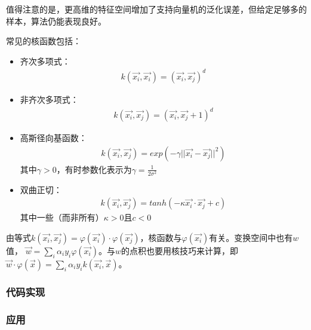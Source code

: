 值得注意的是，更高维的特征空间增加了支持向量机的泛化误差，但给定足够多的样本，算法仍能表现良好。

常见的核函数包括：
\begin{itemize}
    \item 齐次多项式：
        \begin{align}
            k(\overrightarrow{x_i},\overrightarrow{x_i}) = (\overrightarrow{x_i},\overrightarrow{x_j})^d
        \end{align}
    \item 非齐次多项式：
         \begin{align}
            k(\overrightarrow{x_i},\overrightarrow{x_j}) = (\overrightarrow{x_i},\overrightarrow{x_j} + 1)^d
        \end{align}
    \item 高斯径向基函数：
        \begin{align}
            k(\overrightarrow{x_i},\overrightarrow{x_j}) = exp(-\gamma ||\overrightarrow{x_i} - \overrightarrow{x_j}||^2)
        \end{align}
        其中$\gamma > 0$，有时参数化表示为$\gamma = \frac{1}{2\sigma^2}$
    \item 双曲正切：
         \begin{align}
            k(\overrightarrow{x_i},\overrightarrow{x_j}) = tanh(-\kappa \overrightarrow{x_i} \cdot \overrightarrow{x_j} + c)
        \end{align}
        其中一些（而非所有）$\kappa > 0$且$c<0$
\end{itemize}

由等式$k(\overrightarrow{x_i},\overrightarrow{x_j}) = \varphi(\overrightarrow{x_i}) \cdot \varphi(\overrightarrow{x_j})$，核函数与$\varphi(\overrightarrow{x_i})$有关。变换空间中也有$w$值，
$\overrightarrow{w} = \sum_i \alpha_i y_i \varphi(\overrightarrow{x_i})$。与$w$的点积也要用核技巧来计算，即$\overrightarrow{w} \cdot \varphi(\overrightarrow{x}) = \sum_i \alpha_i y_i k(\overrightarrow{x_i},\overrightarrow{x})$。

\subsubsection{代码实现}




\subsubsection{应用}

